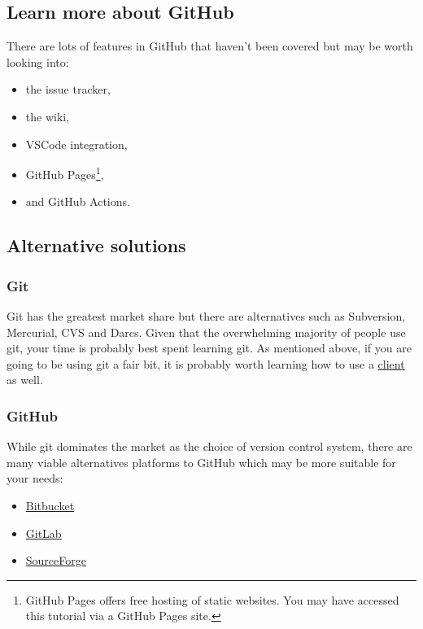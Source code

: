 \documentclass[11pt,onecolumn]{scrartcl}
\begin{document}
\subsection{Learn more about GitHub}
\label{sec:org8cdcd55}

There are lots of features in GitHub that haven't been covered but may be worth
looking into:

\begin{itemize}
\item the issue tracker,
\item the wiki,
\item VSCode integration,
\item GitHub Pages\footnote{GitHub Pages offers free hosting of static websites. You may have accessed this tutorial via a GitHub Pages site.},
\item and GitHub Actions.
\end{itemize}

\subsection{Alternative solutions}
\label{sec:orgea7862d}

\subsubsection*{Git}
\label{sec:org7a449d2}

Git has the greatest market share but there are alternatives such as Subversion,
Mercurial, CVS and Darcs. Given that the overwhelming majority of people use
git, your time is probably best spent learning git. As mentioned above, if you
are going to be using git a fair bit, it is probably worth learning how to use a
\hyperref[sec:org79866fc]{client} as well.

\subsubsection*{GitHub}
\label{sec:orgc9e6d49}

While git dominates the market as the choice of version control system, there
are many viable alternatives platforms to GitHub which may be more suitable for
your needs:

\begin{itemize}
\item \href{https://bitbucket.org/product/}{Bitbucket}
\item \href{https://about.gitlab.com/}{GitLab}
\item \href{https://sourceforge.net/}{SourceForge}
\end{itemize}
\end{document}
